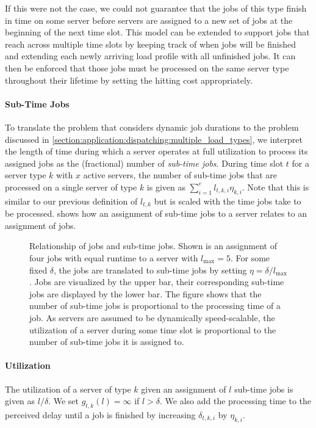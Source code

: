 If this were not the case, we could not guarantee that the jobs of this type finish in time on some server before servers are assigned to a new set of jobs at the beginning of the next time slot. This model can be extended to support jobs that reach across multiple time slots by keeping track of when jobs will be finished and extending each newly arriving load profile with all unfinished jobs. It can then be enforced that those jobs must be processed on the same server type throughout their lifetime by setting the hitting cost appropriately.

\paragraph{Sub-Time Jobs} To translate the problem that considers dynamic job durations to the problem discussed in \cref{section:application:dispatching:multiple_load_types}, we interpret the length of time during which a server operates at full utilization to process its assigned jobs as the (fractional) number of \emph{sub-time jobs}. During time slot $t$ for a server type $k$ with $x$ active servers, the number of sub-time jobs that are processed on a single server of type $k$ is given as $\sum_{i=1}^e l_{t,k,i} \eta_{k,i}$. Note that this is similar to our previous definition of $l_{t,k}$ but is scaled with the time jobs take to be processed.  shows how an assignment of sub-time jobs to a server relates to an assignment of jobs.

\begin{figure}
    \centering
    
    \caption{Relationship of jobs and sub-time jobs. Shown is an assignment of four jobs with equal runtime to a server with $l_{\text{max}} = 5$. For some fixed $\delta$, the jobs are translated to sub-time jobs by setting $\eta = \delta / l_{\text{max}}$. Jobs are visualized by the upper bar, their corresponding sub-time jobs are displayed by the lower bar. The figure shows that the number of sub-time jobs is proportional to the processing time of a job. As servers are assumed to be dynamically speed-scalable, the utilization of a server during some time slot is proportional to the number of sub-time jobs it is assigned to.}
    \label{fig:dynamic_job_duration}
\end{figure}

\paragraph{Utilization} The utilization of a server of type $k$ given an assignment of $l$ sub-time jobs is given as $l / \delta$. We set $g_{t,k}(l) = \infty$ if $l > \delta$. We also add the processing time to the perceived delay until a job is finished by increasing $\delta_{t,k,i}$ by $\eta_{k,i}$.

